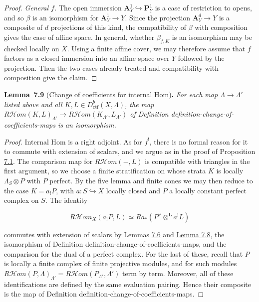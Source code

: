 \documentclass[11pt]{article}
\newenvironment{bpstatement}[2]{\par\addvspace{0.6\baselineskip}\noindent\textbf{#1}#2\textbf{.}\enspace\ignorespaces}
  {\par\addvspace{0.4\baselineskip}}
\newenvironment{bpstatementit}[2]{\begin{bpstatement}{#1}{#2}\itshape\ignorespaces}{\end{bpstatement}}
\providecommand{\cHom}{}\renewcommand{\cHom}{R\mathcal{H}\!om}
\begin{document}
\begin{proof}[{Proof}]
\emph{General \(f\).} The open immersion \(\mathbf A^1_Y\hookrightarrow\mathbf P^1_Y\) is a case of restriction to opens, and so \(\beta\) is an isomorphism for \(\mathbf A^1_Y\to Y\). Since the projection \(\mathbf A^d_Y\to Y\) is a composite of \(d\) projections of this kind, the compatibility of \(\beta\) with composition gives the case of affine space. In general, whether \(\beta_{f,K}\) is an isomorphism may be checked locally on \(X\). Using a finite affine cover, we may therefore assume that \(f\) factors as a closed immersion into an affine space over \(Y\) followed by the projection. Then the two cases already treated and compatibility with composition give the claim.
\end{proof}

\label{bp23}%
\begin{bpstatementit}{Lemma~7.9}{ (Change of coefficients for internal Hom)}
For each map \(\Lambda\to\Lambda'\) listed above and all \(K,L\in D^b_{\mathrm{ctf}}(X,\Lambda)\), the map \(\cHom(K,L)_{\Lambda'}\to\cHom(K_{\Lambda'},L_{\Lambda'})\) of Definition definition-change-of-coefficients-maps is an isomorphism.
\end{bpstatementit}

\begin{proof}[{Proof}]\label{bp24}%
Internal Hom is a right adjoint. As for \(f^!\), there is no formal reason for it to commute with extension of scalars, and we argue as in the proof of Proposition \hyperref[bp5]{7.1}. The comparison map for \(\cHom(-,L)\) is compatible with triangles in the first argument, so we choose a finite stratification on whose strata \(K\) is locally \(\Lambda_S\otimes P\) with \(P\) perfect. By the five lemma and finite cones we may then reduce to the case \(K=a_!P\), with \(a:S\hookrightarrow X\) locally closed and \(P\) a locally constant perfect complex on \(S\). The identity

\[
\cHom_X(a_!P,L)
\simeq Ra_*(P^\vee\otimes^{\mathbf L}a^!L)
\]

commutes with extension of scalars by Lemmas \hyperref[bp16]{7.6} and \hyperref[bp21]{Lemma 7.8}, the isomorphism of Definition definition-change-of-coefficients-maps, and the comparison for the dual of a perfect complex. For the last of these, recall that \(P\) is locally a finite complex of finite projective modules, and for such modules \(\cHom(P,\Lambda)_{\Lambda'}=\cHom(P_{\Lambda'},\Lambda')\) term by term. Moreover, all of these identifications are defined by the same evaluation pairing. Hence their composite is the map of Definition definition-change-of-coefficients-maps.
\end{proof}
\end{document}
